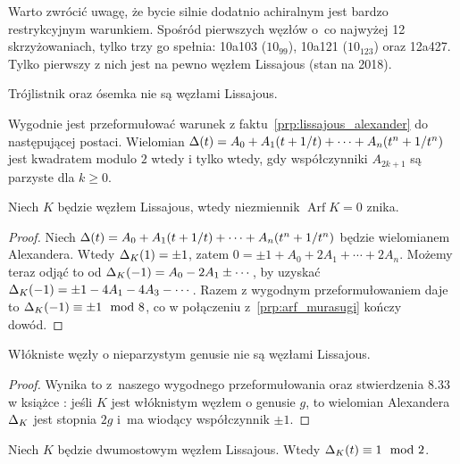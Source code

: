 Warto zwrócić uwagę, że bycie silnie dodatnio achiralnym jest bardzo restrykcyjnym warunkiem.
Spośród pierwszych węzłów o~co najwyżej 12 skrzyżowaniach, tylko trzy go spełnia: 10a103 ($10_{99}$), 10a121 ($10_{123}$) oraz 12a427.
Tylko pierwszy z nich jest na pewno węzłem Lissajous (stan na 2018).

\begin{example}
    Trójlistnik oraz ósemka nie są węzłami Lissajous.
\end{example}

Wygodnie jest przeformułować warunek z faktu~\ref{prp:lissajous_alexander} do następującej postaci.
Wielomian $\Delta(t) = A_0 + A_1(t+1/t) + \cdots + A_n(t^n + 1/t^n)$ jest kwadratem modulo $2$ wtedy i tylko wtedy, gdy współczynniki $A_{2k+1}$ są parzyste dla $k \ge 0$.

\begin{corollary}
%
    Niech $K$ będzie węzłem Lissajous, wtedy niezmiennik $\operatorname{Arf} K = 0$ znika.
\end{corollary}

\begin{proof}
    Niech $\Delta(t) = A_0 + A_1(t+1/t) + \cdots + A_n(t^n + 1/t^n)$ będzie  wielomianem Alexandera.
    Wtedy $\Delta_K(1) = \pm 1$, zatem $0 = \pm 1 + A_0 + 2A_1 + \cdots + 2A_n$.
    Możemy teraz odjąć to od $\Delta_K(-1) = A_0 - 2A_1 \pm \cdots$, by uzyskać $\Delta_K(-1) = \pm 1 - 4A_1 - 4A_3 - \cdots$.
    Razem z wygodnym przeformułowaniem daje to $\Delta_K(-1) \equiv \pm 1 \mod 8$, co w połączeniu z~\ref{prp:arf_murasugi} kończy dowód.
\end{proof}

\begin{corollary}
%
\label{cor:lissajous_fibered}%
    Włókniste węzły o nieparzystym genusie nie są węzłami Lissajous.
\end{corollary}

\begin{proof}
    Wynika to z~naszego wygodnego przeformułowania oraz stwierdzenia 8.33 w książce \cite{burde14}: jeśli $K$ jest włóknistym węzłem o genusie $g$, to wielomian Alexandera $\Delta_K$ jest stopnia $2g$ i~ma wiodący współczynnik $\pm 1$.
\end{proof}

\begin{corollary}
%
\label{cor:lissajous_twobridge}%
    Niech $K$ będzie dwumostowym węzłem Lissajous.
    Wtedy $\Delta_K(t) \equiv 1 \mod 2$.
\end{corollary}


